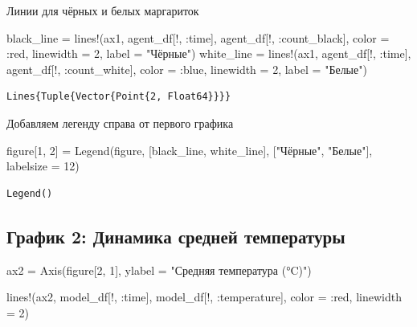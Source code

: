 \documentclass[
  12pt,
  a4paper,
  DIV=11,
  numbers=noendperiod]{scrreprt}
\newenvironment{Shaded}{\begin{snugshade}}{\end{snugshade}}
\newcommand{\FloatTok}[1]{\textcolor[rgb]{0.68,0.00,0.00}{#1}}
\newcommand{\FunctionTok}[1]{\textcolor[rgb]{0.28,0.35,0.67}{#1}}
\newcommand{\NormalTok}[1]{\textcolor[rgb]{0.00,0.23,0.31}{#1}}
\newcommand{\OperatorTok}[1]{\textcolor[rgb]{0.37,0.37,0.37}{#1}}
\newcommand{\StringTok}[1]{\textcolor[rgb]{0.13,0.47,0.30}{#1}}
\begin{document}
Линии для чёрных и белых маргариток

\begin{Shaded}
\begin{Highlighting}[]
\NormalTok{black\_line }\OperatorTok{=} \FunctionTok{lines!}\NormalTok{(ax1, agent\_df[!, }\OperatorTok{:}\NormalTok{time], agent\_df[!, }\OperatorTok{:}\NormalTok{count\_black],}
\NormalTok{                    color }\OperatorTok{=} \OperatorTok{:}\NormalTok{red, linewidth }\OperatorTok{=} \FloatTok{2}\NormalTok{, label }\OperatorTok{=} \StringTok{"Чёрные"}\NormalTok{)}
\NormalTok{white\_line }\OperatorTok{=} \FunctionTok{lines!}\NormalTok{(ax1, agent\_df[!, }\OperatorTok{:}\NormalTok{time], agent\_df[!, }\OperatorTok{:}\NormalTok{count\_white],}
\NormalTok{                    color }\OperatorTok{=} \OperatorTok{:}\NormalTok{blue, linewidth }\OperatorTok{=} \FloatTok{2}\NormalTok{, label }\OperatorTok{=} \StringTok{"Белые"}\NormalTok{)}
\end{Highlighting}
\end{Shaded}

\begin{verbatim}
Lines{Tuple{Vector{Point{2, Float64}}}}
\end{verbatim}

Добавляем легенду справа от первого графика

\begin{Shaded}
\begin{Highlighting}[]
\NormalTok{figure[}\FloatTok{1}\NormalTok{, }\FloatTok{2}\NormalTok{] }\OperatorTok{=} \FunctionTok{Legend}\NormalTok{(figure, [black\_line, white\_line],}
\NormalTok{                      [}\StringTok{"Чёрные"}\NormalTok{, }\StringTok{"Белые"}\NormalTok{], labelsize }\OperatorTok{=} \FloatTok{12}\NormalTok{)}
\end{Highlighting}
\end{Shaded}

\begin{verbatim}
Legend()
\end{verbatim}

\subsection{График 2: Динамика средней
температуры}\label{ux433ux440ux430ux444ux438ux43a-2-ux434ux438ux43dux430ux43cux438ux43aux430-ux441ux440ux435ux434ux43dux435ux439-ux442ux435ux43cux43fux435ux440ux430ux442ux443ux440ux44b}

\begin{Shaded}
\begin{Highlighting}[]
\NormalTok{ax2 }\OperatorTok{=} \FunctionTok{Axis}\NormalTok{(figure[}\FloatTok{2}\NormalTok{, }\FloatTok{1}\NormalTok{],}
\NormalTok{           ylabel }\OperatorTok{=} \StringTok{"Средняя температура (°C)"}\NormalTok{)}

\FunctionTok{lines!}\NormalTok{(ax2, model\_df[!, }\OperatorTok{:}\NormalTok{time], model\_df[!, }\OperatorTok{:}\NormalTok{temperature],}
\NormalTok{       color }\OperatorTok{=} \OperatorTok{:}\NormalTok{red, linewidth }\OperatorTok{=} \FloatTok{2}\NormalTok{)}
\end{Highlighting}
\end{Shaded}
\end{document}
